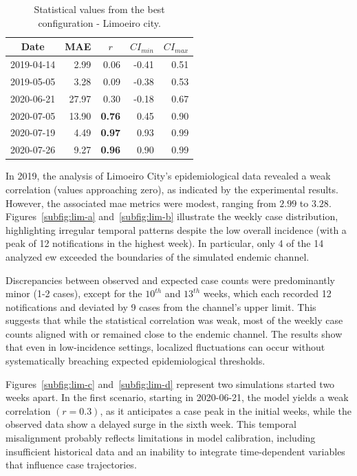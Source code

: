 \begin{table}[!ht]
\centering
\caption{Statistical values from the best configuration - Limoeiro city.}
\label{tab:statistical-data-lim}
\small{%
\begin{tabular}{lrrrr}
\toprule
  \multicolumn{1}{c}{\textbf{Date}} &
  \multicolumn{1}{c}{\textbf{MAE}} &
  \multicolumn{1}{c}{\textbf{$r$}} &
  \multicolumn{1}{c}{\textbf{$CI_{min}$}} &
  \multicolumn{1}{c}{\textbf{$CI_{max}$}} \\ \midrule
2019-04-14 & 2.99  & 0.06          & -0.41 & 0.51 \\
2019-05-05 & 3.28  & 0.09          & -0.38 & 0.53 \\
2020-06-21 & 27.97 & 0.30          & -0.18 & 0.67 \\
2020-07-05 & 13.90 & \textbf{0.76} & 0.45  & 0.90 \\
2020-07-19 & 4.49  & \textbf{0.97} & 0.93  & 0.99 \\
2020-07-26 & 9.27  & \textbf{0.96} & 0.90  & 0.99 \\ \bottomrule
\end{tabular}%
}
\end{table}

In 2019, the analysis of Limoeiro City’s epidemiological data revealed a weak correlation (values approaching zero), as indicated by the experimental results. However, the associated \gls{mae} metrics were modest, ranging from $2.99$ to $3.28$. Figures~\ref{subfig:lim-a} and~\ref{subfig:lim-b} illustrate the weekly case distribution, highlighting irregular temporal patterns despite the low overall incidence (with a peak of 12 notifications in the highest week). In particular, only 4 of the 14 analyzed \gls{ew} exceeded the boundaries of the simulated endemic channel.

Discrepancies between observed and expected case counts were predominantly minor (1-2 cases), except for the $10^{th}$ and $13^{th}$ weeks, which each recorded 12 notifications and deviated by 9 cases from the channel’s upper limit. This suggests that while the statistical correlation was weak, most of the weekly case counts aligned with or remained close to the endemic channel. The results show that even in low-incidence settings, localized fluctuations can occur without systematically breaching expected epidemiological thresholds.

Figures~\ref{subfig:lim-c} and~\ref{subfig:lim-d} represent two simulations started two weeks apart. In the first scenario, starting in 2020-06-21, the model yields a weak correlation $(r = 0.3)$, as it anticipates a case peak in the initial weeks, while the observed data show a delayed surge in the sixth week. This temporal misalignment probably reflects limitations in model calibration, including insufficient historical data and an inability to integrate time-dependent variables that influence case trajectories.

